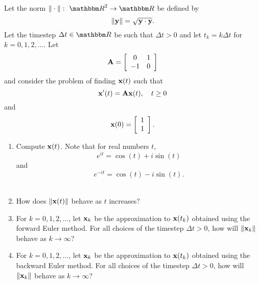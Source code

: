 Let the norm $\norm{\cdot}:\mbox{ }\R^2\rightarrow\R$ be defined by
\[
\|{\bf y}\| = \sqrt{{\bf y}\cdot {\bf y}}.
\]
Let the timestep $\Delta t\in\R$ be such that $\Delta t>0$ and let $t_k=k\Delta t$ for $k=0,1,2,\ldots$. Let
\[
{\bf A} = \left[\begin{array}{cc}0 & 1 \cr -1 & 0\end{array}\right]
\]
and consider the problem of finding ${\bf x}(t)$ such that
\[
{\bf x}'(t) = {\bf A}{\bf x}(t),\quad t\ge 0
\]
and
\[
{\bf x}(0) = \left[\begin{array}{c}1 \\ 1\end{array}\right].
\]
\begin{enumerate}
\item Compute ${\bf x}(t)$. Note that for real numbers $t$, 
\[
e^{i t} = \cos(t) + i\sin(t)
\]
and
\[
e^{-i t} = \cos(t) - i\sin(t).
\]
\\
\item How does $\|{\bf x}(t)\|$ behave as $t$ increases?
\\
\item For $k=0,1,2,\ldots$, let ${\bf x}_k$ be the approximation to ${\bf x}(t_k)$ obtained using the forward Euler method. For all choices of the timestep $\Delta t>0$, how will $\|{\bf x}_k\|$ behave as $k\rightarrow\infty$?
\\
\item For $k=0,1,2,\ldots$, let ${\bf x}_k$ be the approximation to ${\bf x}(t_k)$ obtained using the backward Euler method. For all choices of the timestep $\Delta t>0$, how will $\|{\bf x}_k\|$ behave as $k\rightarrow\infty$?
\end{enumerate}


